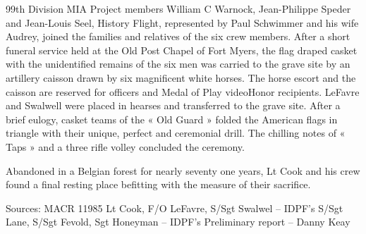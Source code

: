 \documentclass{article}
\begin{document}
\begin{multicols}{3}
99th Division MIA Project members William C Warnock, Jean-Philippe Speder and Jean-Louis Seel,  History Flight, represented by Paul Schwimmer and his wife Audrey, joined the families and relatives of the six crew members. After a short funeral service held at the Old Post Chapel of Fort Myers, the flag draped casket with the unidentified remains of the six men was carried to the grave site by an artillery caisson drawn by six magnificent white horses. The horse escort and the caisson are reserved for officers and Medal of Play videoHonor recipients. LeFavre and Swalwell were placed in hearses and transferred to the grave site. After a brief eulogy, casket teams of the « Old Guard » folded the American flags in triangle with their unique, perfect and ceremonial drill. The chilling notes of « Taps » and a three rifle volley concluded the ceremony.

Abandoned in a Belgian forest for nearly seventy one years, Lt Cook and his crew found a final resting place befitting with the measure of their sacrifice.

Sources:
MACR 11985
Lt Cook, F/O LeFavre, S/Sgt Swalwel – IDPF’s
S/Sgt Lane, S/Sgt Fevold, Sgt Honeyman – IDPF’s
Preliminary report – Danny Keay


\end{multicols}
\end{document}
